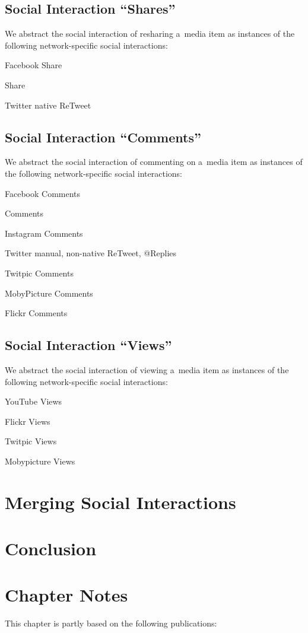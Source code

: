 \subsection{Social Interaction ``Shares''}

We abstract the social interaction of resharing a~media item
as instances of the following network-specific social interactions:

\begin{small_itemize}
  \item[] Facebook Share
  \item[] \googleplus Share
  \item[] Twitter native ReTweet
\end{small_itemize}

\subsection{Social Interaction ``Comments''}

We abstract the social interaction of commenting on a~media item
as instances of the following network-specific social interactions:

\begin{small_itemize}
  \item[] Facebook Comments
  \item[] \googleplus Comments
  \item[] Instagram Comments
  \item[] Twitter manual, non-native ReTweet, @Replies
  \item[] Twitpic Comments
  \item[] MobyPicture Comments
  \item[] Flickr Comments
\end{small_itemize}

\subsection{Social Interaction ``Views''}

We abstract the social interaction of viewing a~media item
as instances of the following network-specific social interactions:

\begin{small_itemize}
  \item[] YouTube Views
  \item[] Flickr Views
  \item[] Twitpic Views
  \item[] Mobypicture Views
\end{small_itemize}

\section{Merging Social Interactions}

  
  
\section{Conclusion}

\section*{Chapter Notes}
This chapter is partly based on the following publications:
